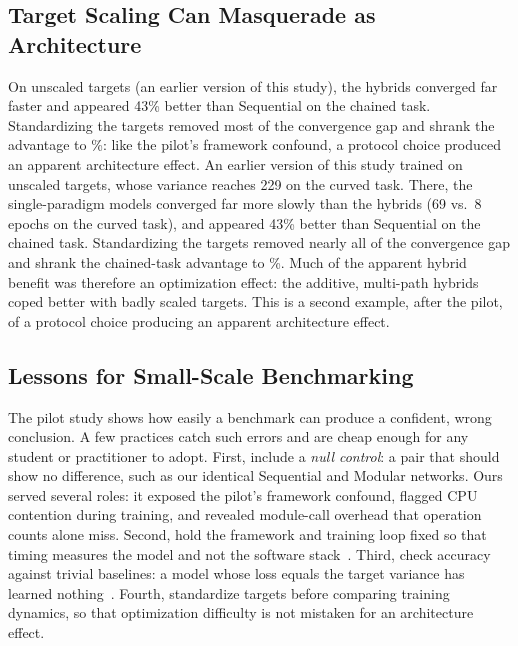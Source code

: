 \subsection{Target Scaling Can Masquerade as Architecture}
\ifcompact
On unscaled targets (an earlier version of this study), the hybrids converged far faster and \HB appeared
43\% better than Sequential on the chained task. Standardizing the targets removed most of the convergence gap
and shrank the advantage to \chainHBGain\%: like the pilot's framework confound, a protocol choice produced an
apparent architecture effect.
\else
An earlier version of this study trained on unscaled targets, whose variance reaches 229 on the curved task. There,
the single-paradigm models converged far more slowly than the hybrids (69 vs.\ 8 epochs on the curved task), and
\HB appeared 43\% better than Sequential on the chained task. Standardizing the targets removed nearly all of the
convergence gap and shrank the chained-task advantage to \chainHBGain\%. Much of the apparent hybrid benefit was
therefore an optimization effect: the additive, multi-path hybrids coped better with badly scaled targets. This is a
second example, after the pilot, of a protocol choice producing an apparent architecture effect.
\fi

\ifcompact\else  %
\subsection{Lessons for Small-Scale Benchmarking}
The pilot study shows how easily a benchmark can produce a confident, wrong
conclusion. A few practices catch such errors and are cheap enough for any student or practitioner to adopt. First,
include a \emph{null control}: a pair that should show no difference, such as our identical Sequential and
Modular networks. Ours served several roles: it exposed the pilot's framework confound, flagged CPU contention during
training, and revealed module-call overhead that operation counts alone miss. Second, hold the framework and training loop fixed so that timing measures the model and not
the software stack~\cite{shi2016benchmarking}. Third, check accuracy against trivial baselines: a model whose loss equals the target variance
has learned nothing~\cite{lipton2019troubling}. Fourth, standardize targets before comparing training dynamics, so that
optimization difficulty is not mistaken for an architecture effect.
\fi

